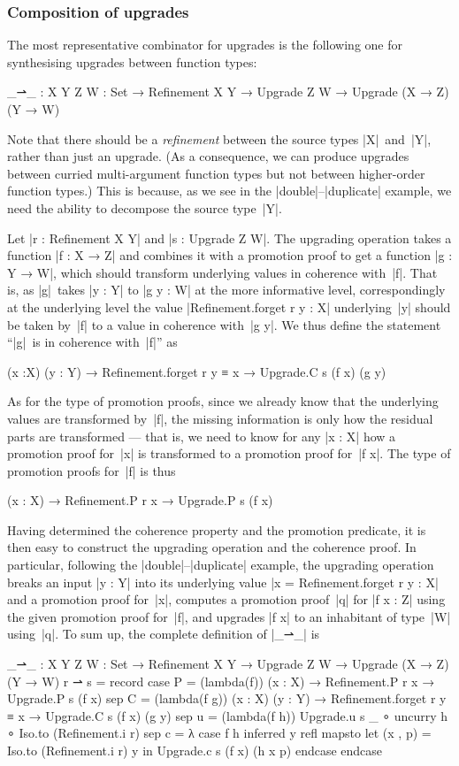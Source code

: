 \subsubsection{Composition of upgrades}
The most representative combinator for upgrades is the following one for synthesising upgrades between function types:
\begin{code}
_⇀_ :  {X Y Z W : Set} →
       Refinement X Y → Upgrade Z W → Upgrade (X → Z) (Y → W)
\end{code}
Note that there should be a \emph{refinement} between the source types |X|~and~|Y|, rather than just an upgrade.
(As a consequence, we can produce upgrades between curried multi-argument function types but not between higher-order function types.)
This is because, as we see in the |double|--|duplicate| example, we need the ability to decompose the source type~|Y|.

Let |r : Refinement X Y| and |s : Upgrade Z W|.
The upgrading operation takes a function |f : X → Z| and combines it with a promotion proof to get a function |g : Y → W|, which should transform underlying values in coherence with~|f|.
That is, as |g|~takes |y : Y| to |g y : W| at the more informative level, correspondingly at the underlying level the value |Refinement.forget r y : X| underlying~|y| should be taken by~|f| to a value in coherence with~|g y|.
We thus define the statement ``|g|~is in coherence with~|f|'' as
\begin{code}
(x :X) (y : Y) → Refinement.forget r y ≡ x → Upgrade.C s (f x) (g y)
\end{code}
As for the type of promotion proofs, since we already know that the underlying values are transformed by~|f|, the missing information is only how the residual parts are transformed --- that is, we need to know for any |x : X| how a promotion proof for~|x| is transformed to a promotion proof for~|f x|.
The type of promotion proofs for~|f| is thus
\begin{code}
(x : X) → Refinement.P r x → Upgrade.P s (f x)
\end{code}
Having determined the coherence property and the promotion predicate, it is then easy to construct the upgrading operation and the coherence proof.
In particular, following the |double|--|duplicate| example, the upgrading operation breaks an input |y : Y| into its underlying value |x = Refinement.forget r y : X| and a promotion proof for~|x|, computes a promotion proof~|q| for |f x : Z| using the given promotion proof for~|f|, and upgrades |f x| to an inhabitant of type~|W| using~|q|.
To sum up, the complete definition of |_⇀_| is
\begin{code}
_⇀_ :  {X Y Z W : Set} →
       Refinement X Y → Upgrade Z W → Upgrade (X → Z) (Y → W)
r ⇀ s = record
  case   P  = (lambda(f)) (x : X) → Refinement.P r x → Upgrade.P s (f x)
  sep    C  = (lambda(f g))  (x : X) (y : Y) →
                             Refinement.forget r y ≡ x → Upgrade.C s (f x) (g y)
  sep    u  = (lambda(f h)) Upgrade.u s _ ∘ uncurry h ∘ Iso.to (Refinement.i r)
  sep    c  = λ case f h inferred y refl mapsto  let  (x , p) = Iso.to (Refinement.i r) y
                                                 in   Upgrade.c s (f x) (h x p) endcase endcase
\end{code}

